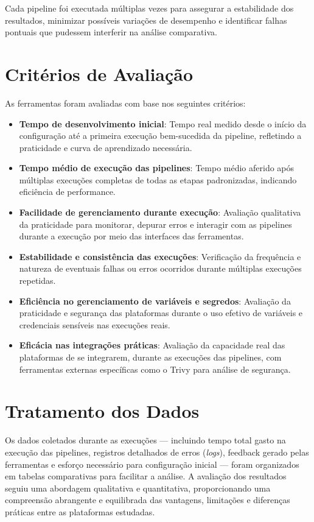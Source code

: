 Cada pipeline foi executada múltiplas vezes para assegurar a estabilidade dos resultados, minimizar possíveis variações de desempenho e identificar falhas pontuais que pudessem interferir na análise comparativa.

\section{Critérios de Avaliação}

As ferramentas foram avaliadas com base nos seguintes critérios:


\begin{itemize}
    \item \textbf{Tempo de desenvolvimento inicial}: Tempo real medido desde o início da configuração até a primeira execução bem-sucedida da pipeline, refletindo a praticidade e curva de aprendizado necessária.

    \item \textbf{Tempo médio de execução das pipelines}: Tempo médio aferido após múltiplas execuções completas de todas as etapas padronizadas, indicando eficiência de performance.

    \item \textbf{Facilidade de gerenciamento durante execução}: Avaliação qualitativa da praticidade para monitorar, depurar erros e interagir com as pipelines durante a execução por meio das interfaces das ferramentas.

    \item \textbf{Estabilidade e consistência das execuções}: Verificação da frequência e natureza de eventuais falhas ou erros ocorridos durante múltiplas execuções repetidas.

    \item \textbf{Eficiência no gerenciamento de variáveis e segredos}: Avaliação da praticidade e segurança das plataformas durante o uso efetivo de variáveis e credenciais sensíveis nas execuções reais.

    \item \textbf{Eficácia nas integrações práticas}: Avaliação da capacidade real das plataformas de se integrarem, durante as execuções das pipelines, com ferramentas externas específicas como o Trivy para análise de segurança.
\end{itemize}

\section{Tratamento dos Dados}

Os dados coletados durante as execuções — incluindo tempo total gasto na execução das pipelines, registros detalhados de erros (\textit{logs}), feedback gerado pelas ferramentas e esforço necessário para configuração inicial — foram organizados em tabelas comparativas para facilitar a análise. A avaliação dos resultados seguiu uma abordagem qualitativa e quantitativa, proporcionando uma compreensão abrangente e equilibrada das vantagens, limitações e diferenças práticas entre as plataformas estudadas.


